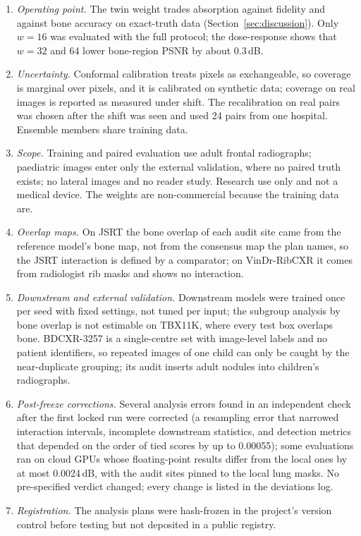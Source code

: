 \begin{enumerate}
 prediction at 1024 px closes the remaining gap was not tested.
\item \emph{Operating point.} The twin weight trades absorption against fidelity and against bone accuracy on exact-truth data (Section~\ref{sec:discussion}).
 Only $w=16$ was evaluated with the full protocol; the dose-response shows that $w=32$ and 64 lower bone-region PSNR by about 0.3\,dB.
\item \emph{Uncertainty.} Conformal calibration treats pixels as exchangeable, so coverage is marginal over pixels, and it is calibrated on synthetic
 data; coverage on real images is reported as measured under shift. The recalibration on real pairs was chosen after the shift was seen and
 used 24 pairs from one hospital. Ensemble members share training data.
\item \emph{Scope.} Training and paired evaluation use adult frontal radiographs; paediatric images enter only the external validation, where no
 paired truth exists; no lateral images and no reader study. Research use only and not a medical device. The weights are non-commercial because
 the training data are.
\item \emph{Overlap maps.} On JSRT the bone overlap of each audit site came from the reference model's bone map, not from the consensus map the
 plan names, so the JSRT interaction is defined by a comparator; on VinDr-RibCXR it comes from radiologist rib masks and shows no interaction.
\item \emph{Downstream and external validation.} Downstream models were trained once per seed with fixed settings, not tuned per input; the
 subgroup analysis by bone overlap is not estimable on TBX11K, where every test box overlaps bone. BDCXR-3257 is a single-centre set with
 image-level labels and no patient identifiers, so repeated images of one child can only be caught by the near-duplicate grouping; its audit
 inserts adult nodules into children's radiographs.
\item \emph{Post-freeze corrections.} Several analysis errors found in an independent check after the first locked run were corrected
 (a resampling error that narrowed interaction intervals, incomplete downstream statistics, and detection metrics that depended on the order of
 tied scores by up to 0.00055); some evaluations ran on cloud GPUs whose floating-point results differ from the local ones by at most
 0.0024\,dB, with the audit sites pinned to the local lung masks. No pre-specified verdict changed; every change is listed in the deviations log.
\item \emph{Registration.} The analysis plans were hash-frozen in the project's version control before testing but not deposited in a public
 registry.
\end{enumerate}
